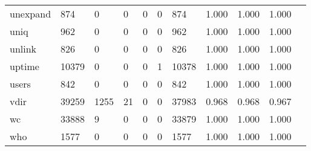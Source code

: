 \begin{longtable}{lp{1.10cm}p{1.10cm}p{1.10cm}p{1.10cm}p{1.10cm}p{1.10cm}p{1.10cm}p{1.10cm}p{1.10cm}p{1.10cm}}
unexpand  &                    874 &                                  0 &                                 0 &                                0 &                                 0 &                             874 &                             1.000 &                                 1.000 &                               1.000 \\
uniq      &                    962 &                                  0 &                                 0 &                                0 &                                 0 &                             962 &                             1.000 &                                 1.000 &                               1.000 \\
unlink    &                    826 &                                  0 &                                 0 &                                0 &                                 0 &                             826 &                             1.000 &                                 1.000 &                               1.000 \\
uptime    &                  10379 &                                  0 &                                 0 &                                0 &                                 1 &                           10378 &                             1.000 &                                 1.000 &                               1.000 \\
users     &                    842 &                                  0 &                                 0 &                                0 &                                 0 &                             842 &                             1.000 &                                 1.000 &                               1.000 \\
vdir      &                  39259 &                               1255 &                                21 &                                0 &                                 0 &                           37983 &                             0.968 &                                 0.968 &                               0.967 \\
wc        &                  33888 &                                  9 &                                 0 &                                0 &                                 0 &                           33879 &                             1.000 &                                 1.000 &                               1.000 \\
who       &                   1577 &                                  0 &                                 0 &                                0 &                                 0 &                            1577 &                             1.000 &                                 1.000 &                               1.000 \\

\end{longtable}
